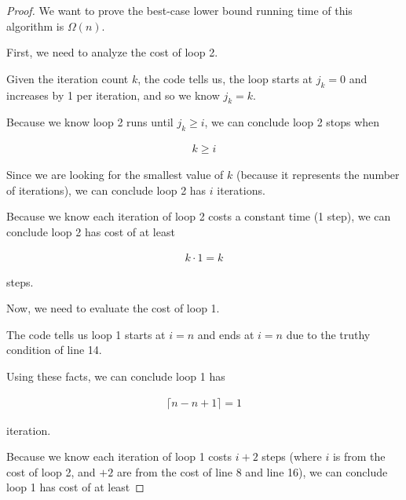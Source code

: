 \documentclass[12pt]{article}
\begin{document}
\begin{enumerate}[a.]
\begin{proof}
        \bigskip

        We want to prove the best-case lower bound running time of this algorithm is $\Omega(n)$.

        \bigskip

        First, we need to analyze the cost of loop 2.

        \bigskip

        Given the iteration count $k$, the code tells us, the loop starts at $j_k = 0$
        and increases by 1 per iteration, and so we know $j_k = k$.

        \bigskip

        Because we know loop 2 runs until $j_k \geq i$, we can conclude loop 2 stops when

        \setcounter{equation}{0}
        \begin{align}
            k \geq i
        \end{align}

        \bigskip

        Since we are looking for the smallest value of $k$ (because it represents the
        number of iterations), we can conclude loop 2 has $i$ iterations.

        \bigskip

        Because we know each iteration of loop 2 costs a constant time (1 step), we
        can conclude loop 2 has cost of at least

        \begin{align}
            k \cdot 1 = k
        \end{align}

        steps.

        \bigskip

        Now, we need to evaluate the cost of loop 1.

        \bigskip

        The code tells us loop 1 starts at $i = n$ and ends at $i = n$ due to the truthy
        condition of line 14.

        \bigskip

        Using these facts, we can conclude loop 1 has

        \begin{align}
            \lceil n -n + 1 \rceil = 1
        \end{align}

        iteration.

        \bigskip

        Because we know each iteration of loop 1 costs $i + 2$ steps (where $i$ is
        from the cost of loop 2, and $+2$ are from the cost of line 8 and line 16),
        we can conclude loop 1 has cost of at least


\end{proof}
\end{enumerate}
\end{document}

